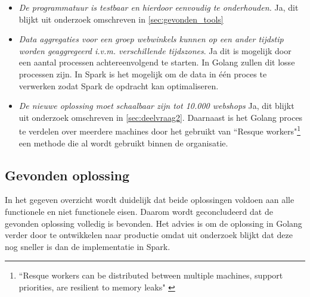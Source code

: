 \begin{itemize}
    \item \textit{De programmatuur is testbaar en hierdoor eenvoudig te onderhouden.}  Ja, dit blijkt uit onderzoek omschreven in  \ref{sec:gevonden_tools}
    
    \item \textit{Data aggregaties voor een groep webwinkels kunnen op een ander tijdstip worden geaggregeerd i.v.m. verschillende tijdszones}. Ja dit is mogelijk door een aantal processen achtereenvolgend te starten. In Golang zullen dit losse processen zijn. In Spark is het mogelijk om de data in één proces te verwerken zodat Spark de opdracht kan optimaliseren.
    
    \item \textit{De nieuwe oplossing moet schaalbaar zijn tot 10.000 webshops} Ja, dit blijkt uit onderzoek omschreven in \ref{sec:deelvraag2}. Daarnaast is het Golang proces te verdelen over meerdere machines door het gebruikt van ``Resque workers"\footnote{``Resque workers can be distributed between multiple machines, support priorities, are resilient to memory leaks" \parencite{github2016reque}} een methode die al wordt gebruikt binnen de organisatie. 
\end{itemize}

\subsection{Gevonden oplossing}
 
In het gegeven overzicht wordt duidelijk dat beide oplossingen voldoen aan alle functionele en niet functionele eisen. Daarom wordt geconcludeerd dat de gevonden oplossing volledig is bevonden. Het advies is om de oplossing in Golang verder door te ontwikkelen naar productie omdat uit onderzoek blijkt dat deze nog sneller is dan de implementatie in Spark.